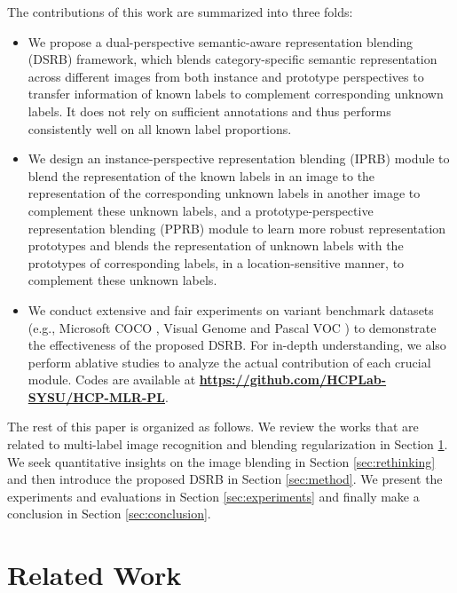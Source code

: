\documentclass[lettersize,journal]{IEEEtran}
\begin{document}
The contributions of this work are summarized into three folds: 
\begin{itemize}
\item We propose a dual-perspective semantic-aware representation blending (DSRB) framework, which blends category-specific semantic representation across different images from both instance and prototype perspectives to transfer information of known labels to complement corresponding unknown labels. It does not rely on sufficient annotations and thus performs consistently well on all known label proportions.

\item We design an instance-perspective representation blending (IPRB) module to blend the representation of the known labels in an image to the representation of the corresponding unknown labels in another image to complement these unknown labels, and a prototype-perspective representation blending (PPRB) module to learn more robust representation prototypes and blends the representation of unknown labels with the prototypes of corresponding labels, in a location-sensitive manner, to complement these unknown labels.

\item We conduct extensive and fair experiments on variant benchmark datasets (e.g., Microsoft COCO \cite{Lin2014COCO}, Visual Genome \cite{Krishna2017VG} and Pascal VOC \cite{Everingham2010Pascal}) to demonstrate the effectiveness of the proposed DSRB. For in-depth understanding, we also perform ablative studies to analyze the actual contribution of each crucial module. Codes are available at \textbf{\url{https://github.com/HCPLab-SYSU/HCP-MLR-PL}}.
\end{itemize}

The rest of this paper is organized as follows. We review the works that are related to multi-label image recognition and blending regularization in Section \ref{sec:related}. We seek quantitative insights on the image blending in Section \ref{sec:rethinking} and then introduce the proposed DSRB in Section \ref{sec:method}. We present the experiments and evaluations in Section \ref{sec:experiments} and finally make a conclusion in Section \ref{sec:conclusion}.

\section{Related Work} \label{sec:related}
\end{document}
